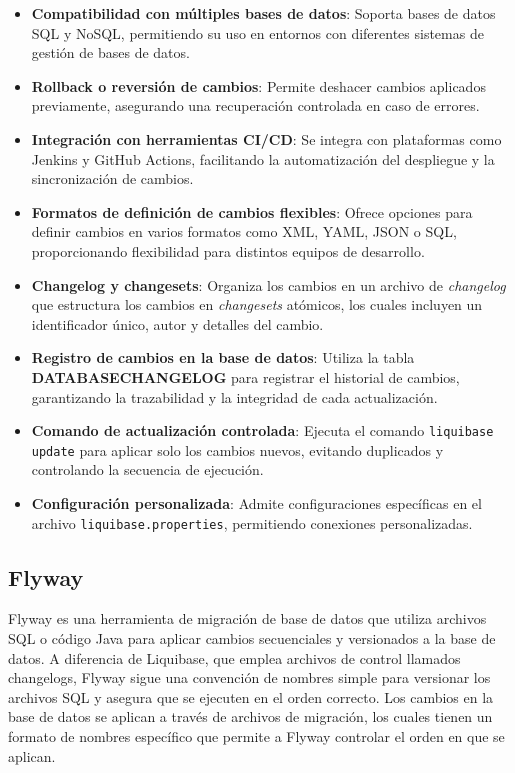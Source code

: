 \documentclass{IEEEtran}
\begin{document}
\begin{itemize}
    \item \textbf{Compatibilidad con múltiples bases de datos}: Soporta bases de datos SQL y NoSQL, permitiendo su uso en entornos con diferentes sistemas de gestión de bases de datos.
    \item \textbf{Rollback o reversión de cambios}: Permite deshacer cambios aplicados previamente, asegurando una recuperación controlada en caso de errores.
    \item \textbf{Integración con herramientas CI/CD}: Se integra con plataformas como Jenkins y GitHub Actions, facilitando la automatización del despliegue y la sincronización de cambios.
    \item \textbf{Formatos de definición de cambios flexibles}: Ofrece opciones para definir cambios en varios formatos como XML, YAML, JSON o SQL, proporcionando flexibilidad para distintos equipos de desarrollo.
    \item \textbf{Changelog y changesets}: Organiza los cambios en un archivo de \textit{changelog} que estructura los cambios en \textit{changesets} atómicos, los cuales incluyen un identificador único, autor y detalles del cambio.
    \item \textbf{Registro de cambios en la base de datos}: Utiliza la tabla \textbf{DATABASECHANGELOG} para registrar el historial de cambios, garantizando la trazabilidad y la integridad de cada actualización.
    \item \textbf{Comando de actualización controlada}: Ejecuta el comando \texttt{liquibase update} para aplicar solo los cambios nuevos, evitando duplicados y controlando la secuencia de ejecución.
    \item \textbf{Configuración personalizada}: Admite configuraciones específicas en el archivo \texttt{liquibase.properties}, permitiendo conexiones personalizadas.
\end{itemize}

\subsection{Flyway}

Flyway es una herramienta de migración de base de datos que utiliza archivos SQL o código Java para aplicar cambios secuenciales y versionados a la base de datos. A diferencia de Liquibase, que emplea archivos de control llamados changelogs, Flyway sigue una convención de nombres simple para versionar los archivos SQL y asegura que se ejecuten en el orden correcto. Los cambios en la base de datos se aplican a través de archivos de migración, los cuales tienen un formato de nombres específico que permite a Flyway controlar el orden en que se aplican. 
\end{document}
